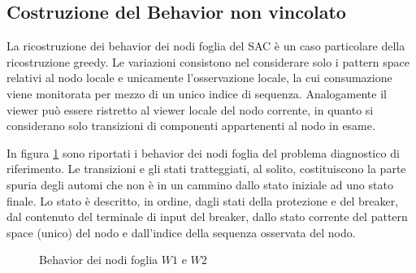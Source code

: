 \subsection{Costruzione del Behavior non vincolato}
La ricostruzione dei behavior dei nodi foglia del SAC è un caso particolare della ricostruzione greedy. Le variazioni consistono nel considerare solo i pattern space relativi al nodo locale e unicamente l'osservazione locale, la cui consumazione viene monitorata per mezzo di un unico indice di sequenza. Analogamente il viewer può essere ristretto al viewer locale del nodo corrente, in quanto si considerano solo transizioni di componenti appartenenti al nodo in esame.

\begin{ex}
In figura \ref{fig:bhv_leaves} sono riportati i behavior dei nodi foglia del problema diagnostico di riferimento. Le transizioni e gli stati tratteggiati, al solito, costituiscono la parte spuria degli automi che non è in un cammino dallo stato iniziale ad uno stato finale.
Lo stato è descritto, in ordine, dagli stati della protezione e del breaker, dal contenuto del terminale di input del breaker, dallo stato corrente del pattern space (unico) del nodo e dall'indice della sequenza osservata del nodo. 
\end{ex}

\begin{figure}[htbp]
\centering
{}
\hspace{5mm}
\caption{Behavior dei nodi foglia $W1$ e $W2$}
\label{fig:bhv_leaves}
\end{figure}

